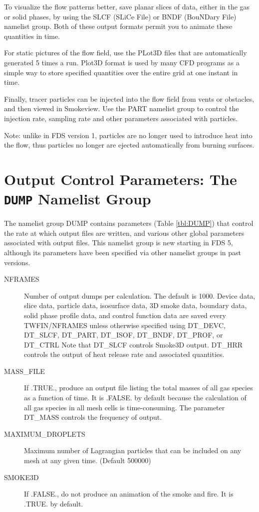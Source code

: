 \documentclass[11pt]{book}
\begin{document}
To visualize the flow patterns better, save planar
slices of data, either in the gas or solid phases, by using the
{\ct SLCF} (SLiCe File) or {\ct BNDF} (BouNDary File) namelist group.
Both of these output formats permit you to animate these quantities in
time.

For static pictures of the flow field, use the PLot3D files
that are automatically generated 5 times a run. Plot3D format is used by many CFD programs as a simple
way to store specified quantities over the entire grid at one instant in
time.

Finally, tracer particles can be injected into the flow field from
vents or obstacles, and then viewed in Smokeview. Use the {\ct PART}
namelist group to control the injection rate, sampling rate and other
parameters associated with particles.

\begin{warning}
\noindent
Note: unlike in FDS version 1,
particles are no longer used to introduce heat into the flow, thus
particles no longer are ejected automatically from burning surfaces.
\end{warning}


\section{Output Control Parameters: The \texorpdfstring{{\tt DUMP}}{DUMP} Namelist Group}
\label{info:DUMP}

The namelist group {\ct DUMP} contains parameters (Table \ref{tbl:DUMP}) that control the rate at which output files
are written, and various other global parameters associated with output files.
This namelist group is new starting in FDS 5, although its
parameters have been specified via other namelist groups in past versions.

\begin{description}
\item[{\ct NFRAMES}] Number of output dumps per calculation. The default is 1000.
Device data, slice data, particle data, isosurface data, 3D smoke data, boundary data, solid phase profile data, and
control function data are saved every {\ct TWFIN/NFRAMES} unless otherwise specified
using {\ct DT\_DEVC}, {\ct DT\_SLCF}, {\ct DT\_PART}, {\ct DT\_ISOF}, {\ct DT\_BNDF}, {\ct DT\_PROF},
or {\ct DT\_CTRL} Note that {\ct DT\_SLCF} controls Smoke3D output. {\ct DT\_HRR} controls the
output of heat release rate and associated quantities.
\item[{\ct MASS\_FILE}] If {\ct .TRUE.}, produce an output file listing the total masses of all gas species as a function of time. It is {\ct .FALSE.} by default because the calculation
of all gas species in all mesh cells is time-consuming. The parameter {\ct DT\_MASS} controls the frequency of output.
\item[{\ct MAXIMUM\_DROPLETS}] Maximum number of Lagrangian particles that can be included on any
mesh at any given time. (Default 500000)
\item[{\ct SMOKE3D}] If {\ct .FALSE.}, do not produce an animation of the smoke and fire. It is {\ct .TRUE.} by default.
\end{description}
\end{document}
